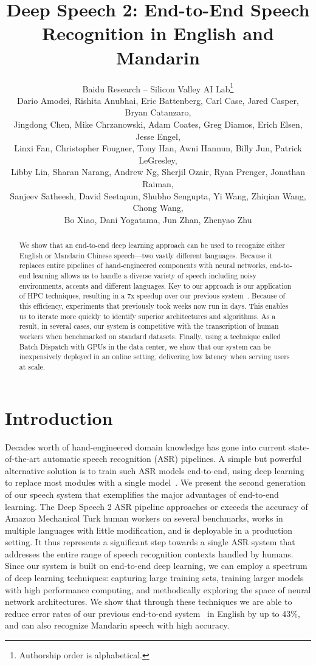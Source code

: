 \documentclass{article}
\title{Deep Speech 2: End-to-End Speech Recognition in English and Mandarin}
\author{Baidu Research -- Silicon Valley AI Lab\thanks{Authorship order is alphabetical.} \\ 
Dario Amodei, Rishita Anubhai, Eric Battenberg,  Carl Case, Jared Casper, Bryan Catanzaro, \\ Jingdong Chen, Mike Chrzanowski, Adam Coates, Greg Diamos, Erich Elsen, Jesse	Engel, \\ Linxi Fan, Christopher Fougner, Tony Han, Awni Hannun, Billy Jun, Patrick LeGresley, \\ Libby Lin, Sharan Narang, Andrew Ng, Sherjil Ozair, Ryan Prenger, Jonathan Raiman, \\ Sanjeev Satheesh, David Seetapun, Shubho Sengupta, Yi Wang, Zhiqian Wang, Chong Wang, \\ Bo Xiao, Dani Yogatama, Jun Zhan, Zhenyao Zhu}
\begin{document}
 
\maketitle
\vskip -0.2in
\begin{abstract} 

We show that an end-to-end deep learning approach can be used to recognize either English or Mandarin Chinese speech---two vastly different languages. Because it replaces entire pipelines of hand-engineered components with neural networks, end-to-end learning allows us to handle a diverse variety of speech including noisy environments, accents and different languages. Key to our approach is our application of HPC techniques, resulting in a 7x speedup over our previous system~\cite{hannun2014deepspeech}. Because of this efficiency, experiments that previously took weeks now run in days. This enables us to iterate more quickly to identify superior architectures and algorithms. As a result, in several cases, our system is competitive with the transcription of human workers when benchmarked on standard datasets. Finally, using a technique called Batch Dispatch with GPUs in the data center, we show that our system can be inexpensively deployed in an online setting, delivering low latency when serving users at scale.

\end{abstract}

\section{Introduction}
\label{section:intro}

Decades worth of hand-engineered domain knowledge has gone into current state-of-the-art automatic speech recognition (ASR) pipelines.  A simple but powerful alternative solution is to train such ASR models end-to-end, using deep learning to replace most modules with a single model~\cite{hannun2014deepspeech}. We present the second generation of our speech system that exemplifies the major advantages of end-to-end learning. The {Deep Speech 2} ASR pipeline approaches or exceeds the accuracy of Amazon Mechanical Turk human workers on several benchmarks, works in multiple languages with little modification, and is deployable in a production setting. It thus represents a significant step towards a single ASR system that addresses the entire range of speech recognition contexts handled by humans. Since our system is built on end-to-end deep learning, we can employ a spectrum of deep learning techniques: capturing large training sets, training larger models with high performance computing, and methodically exploring the space of neural network architectures. We show that through these techniques we are able to reduce error rates of our previous end-to-end system~\cite{hannun2014deepspeech} in English by up to 43\%, and can also recognize Mandarin speech with high accuracy.
\end{document}
